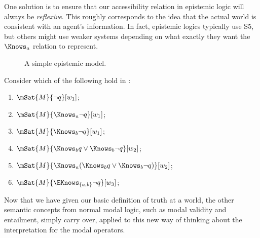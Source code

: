 \documentclass[../../../include/open-logic-section]{subfiles}
\begin{document}
One solution is to ensure that our accessibility relation in epistemic
logic will always be \emph{reflexive}. This roughly corresponds to the
idea that the actual world is consistent with an agent's information.
In fact, epistemic logics typically use S5, but others might use
weaker systems depending on what exactly they want the $\Knows_a$
relation to represent.

\begin{figure}
  \begin{center}
  \end{center}
  \caption{A simple epistemic model.}
\end{figure}

\begin{prob}
  Consider which of the following hold in
  :
  \begin{enumerate}
    \item $\mSat{M}{\lnot q}[w_1]$;
    \item $\mSat{M}{\Knows_a \lnot q}[w_1]$;
    \item $\mSat{M}{\Knows_b \lnot q}[w_1]$;
    \item $\mSat{M}{\Knows_b q \lor \Knows_b \lnot q}[w_2]$;
    \item $\mSat{M}{\Knows_a( \Knows_b q \lor \Knows_b \lnot q)}[w_2]$;
    \item $\mSat{M}{\EKnows_{\{a,b\}} \lnot q}[w_3]$;
    \end{enumerate}
\end{prob}

Now that we have given our basic definition of truth at a world, the
other semantic concepts from normal modal logic, such as modal
validity and entailment, simply carry over, applied to this new way of
thinking about the interpretation for the modal operators.
\end{document}
